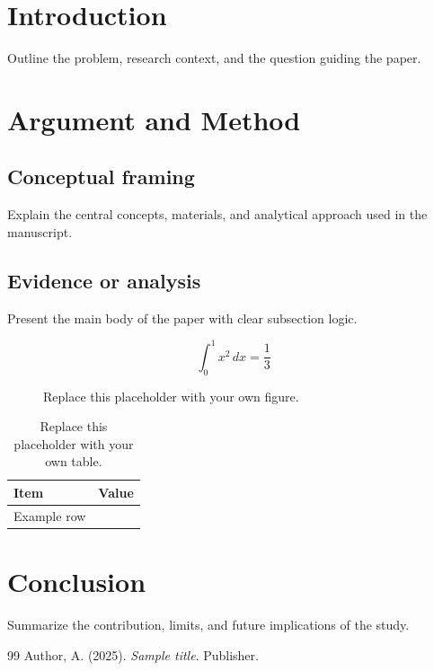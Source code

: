 \documentclass{FUCKJournal}
\begin{document}
\makefjtitle

\section{Introduction}
Outline the problem, research context, and the question guiding the paper.

\section{Argument and Method}
\subsection{Conceptual framing}
Explain the central concepts, materials, and analytical approach used in the manuscript.

\subsection{Evidence or analysis}
Present the main body of the paper with clear subsection logic.

\begin{equation}
\int_{0}^{1} x^2 \, dx = \frac{1}{3}
\end{equation}

\begin{figure}[htbp]
\centering
\fbox{\rule{0pt}{4cm}\rule{0.8\columnwidth}{0pt}}
\caption{Replace this placeholder with your own figure.}
\label{fig:placeholder}
\end{figure}

\begin{table}[htbp]
\centering
\caption{Replace this placeholder with your own table.}
\begin{tabularx}{\linewidth}{>{\raggedright\arraybackslash}X>{\raggedleft\arraybackslash}X}
\toprule
Item & Value \\
\midrule
Example row & 1 \\
\bottomrule
\end{tabularx}
\end{table}

\section{Conclusion}
Summarize the contribution, limits, and future implications of the study.

\begin{thebibliography}{99}
Author, A. (2025). \textit{Sample title}. Publisher.
\end{thebibliography}
\end{document}
